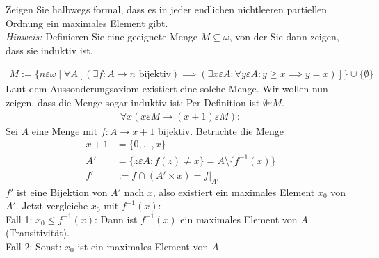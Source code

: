 
\begin{exercise}[268]

Zeigen Sie halbwegs formal, dass es in jeder endlichen nichtleeren partiellen
Ordnung ein maximales Element gibt. \\
\textit{Hinweis:} Definieren Sie eine geeignete Menge $M \subseteq \omega$, von
der Sie dann zeigen, dass sie induktiv ist.

\end{exercise}


\begin{solution}
\begin{align*}
  M := \{n \varepsilon \omega \mid \forall A[ (\exists f: A \to n \text{ bijektiv})
  \implies (\exists x \varepsilon A: \forall y \varepsilon A: y \geq x \implies  y = x)]\}
  \cup \{\emptyset\}
\end{align*}
Laut dem Aussonderungsaxiom existiert eine solche Menge.
Wir wollen nun zeigen, dass die Menge sogar induktiv ist:
Per Definition ist $\emptyset \varepsilon M$.
\begin{align*}
  \forall x (x \varepsilon M \rightarrow (x + 1) \varepsilon M):
\end{align*}
Sei $A$ eine Menge mit $f: A \to x + 1$ bijektiv. Betrachte die Menge
\begin{align*}
  x + 1 &= \{0,\dots,x\} \\
  A' &= \{z \varepsilon A: f(z) \neq x\} = A \setminus \{f^{-1}(x)\} \\
  f' &:= f \cap (A' \times x) = f|_{A'}
\end{align*}
$f'$ ist eine Bijektion von $A'$ nach $x$, also existiert ein maximales Element $x_0$ von $A'$.
Jetzt vergleiche $x_0$ mit $f^{-1}(x)$: \\
Fall 1: $x_0 \leq f^{-1}(x)$: Dann ist $f^{-1}(x)$ ein maximales Element von $A$ (Transitivität). \\
Fall 2: Sonst: $x_0$ ist ein maximales Element von $A$.
\end{solution}
